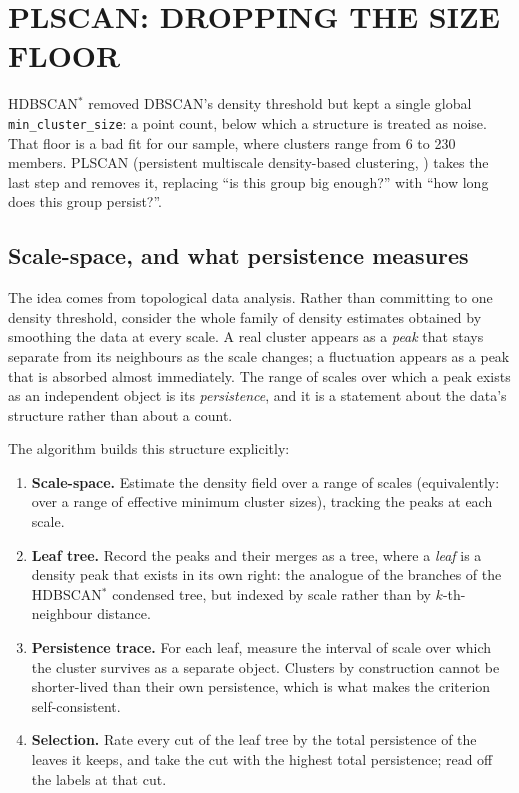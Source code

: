 \section{PLSCAN: DROPPING THE SIZE FLOOR}
\label{sec:plscan}


HDBSCAN$^*$ removed DBSCAN's density threshold but kept a single global
\texttt{min\_cluster\_size}: a point count, below which a structure is treated
as noise. That floor is a bad fit for our sample, where clusters range from 6
to 230 members. PLSCAN (persistent multiscale density-based clustering,
\citet{Bot:25}) takes the last step and removes it, replacing ``is this group
big enough?'' with ``how long does this group persist?''.

\subsection{Scale-space, and what persistence measures}

The idea comes from topological data analysis. Rather than committing to one
density threshold, consider the whole family of density estimates obtained by
smoothing the data at every scale. A real cluster appears as a \emph{peak}
that stays separate from its neighbours as the scale changes; a fluctuation
appears as a peak that is absorbed almost immediately. The range of scales
over which a peak exists as an independent object is its \emph{persistence},
and it is a statement about the data's structure rather than about a count.

The algorithm builds this structure explicitly:

\begin{enumerate}
\item \textbf{Scale-space.} Estimate the density field over a range of scales
  (equivalently: over a range of effective minimum cluster sizes), tracking the
  peaks at each scale.
\item \textbf{Leaf tree.} Record the peaks and their merges as a tree, where a
\emph{leaf} is a density peak that exists in its own right: the analogue of the
branches of the HDBSCAN$^*$ condensed tree, but indexed by scale rather than by
$k$-th-neighbour distance.
\item \textbf{Persistence trace.} For each leaf, measure the interval of scale
  over which the cluster survives as a separate object. Clusters by
  construction cannot be shorter-lived than their own persistence, which is
  what makes the criterion self-consistent.
\item \textbf{Selection.} Rate every cut of the leaf tree by the total
  persistence of the leaves it keeps, and take the cut with the highest total
  persistence; read off the labels at that cut.
\end{enumerate}

